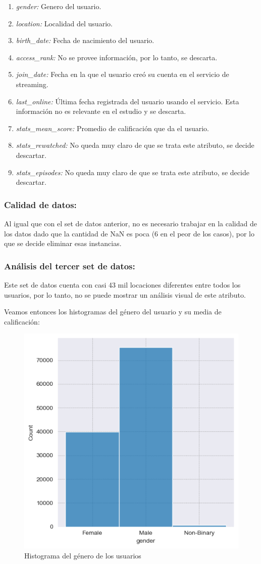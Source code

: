 \documentclass[a4paper]{article}
\begin{document}
\begin{enumerate}
    \item \textit{gender:} Genero del usuario.
    \item \textit{location:} Localidad del usuario.
    \item \textit{birth\_date:} Fecha de nacimiento del usuario.
    \item \textit{access\_rank:} No se provee información, por lo tanto, se descarta.
    \item \textit{join\_date:} Fecha en la que el usuario creó su cuenta en el servicio de streaming.
    \item \textit{last\_online:} Última fecha registrada del usuario usando el servicio. Esta información no es relevante en el estudio y se descarta.
    \item \textit{stats\_mean\_score:} Promedio de calificación que da el usuario.
    \item \textit{stats\_rewatched:} No queda muy claro de que se trata este atributo, se decide descartar.
    \item \textit{stats\_episodes:} No queda muy claro de que se trata este atributo, se decide descartar.
\end{enumerate}

\subsubsection{Calidad de datos:}
Al igual que con el set de datos anterior, no es necesario trabajar en la calidad de los datos dado que la cantidad de NaN es poca (6 en el peor de los casos), por lo que se decide eliminar esas instancias.

\subsubsection{Análisis del tercer set de datos:}
Este set de datos cuenta con casi 43 mil locaciones diferentes entre todos los usuarios, por lo tanto, no se puede mostrar un análisis visual de este atributo.

Veamos entonces los histogramas del género del usuario y su media de calificación:\newpage

\begin{figure}[hbtp!]
    \centering
    \includegraphics[width=0.5\linewidth]{Module_4_BigData//Proyecto//Propuestas//Imagenes/p2_dataset3_user_gender_histogram.png}
    \caption{Histograma del género de los usuarios}
    \label{fig:hist_p2_dataset3_gender}
\end{figure}
\end{document}
